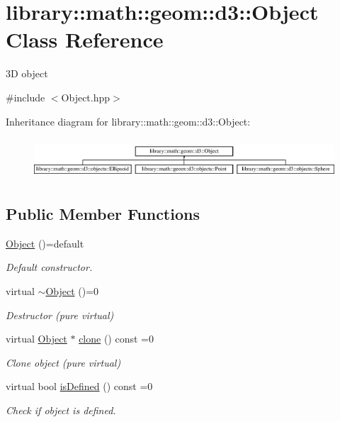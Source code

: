 \hypertarget{classlibrary_1_1math_1_1geom_1_1d3_1_1_object}{}\section{library\+:\+:math\+:\+:geom\+:\+:d3\+:\+:Object Class Reference}
\label{classlibrary_1_1math_1_1geom_1_1d3_1_1_object}


3D object  




{\ttfamily \#include $<$Object.\+hpp$>$}

Inheritance diagram for library\+:\+:math\+:\+:geom\+:\+:d3\+:\+:Object\+:\begin{figure}[H]
\begin{center}
\leavevmode
\includegraphics[height=1.530055cm]{classlibrary_1_1math_1_1geom_1_1d3_1_1_object}
\end{center}
\end{figure}
\subsection*{Public Member Functions}
\begin{DoxyCompactItemize}
\item 
\hyperlink{classlibrary_1_1math_1_1geom_1_1d3_1_1_object_ab484354bbce44290b6d288c7825d9e42}{Object} ()=default
\begin{DoxyCompactList}\small\item\em Default constructor. \end{DoxyCompactList}\item 
virtual \hyperlink{classlibrary_1_1math_1_1geom_1_1d3_1_1_object_addfda217130395f6eeb080a2fe406876}{$\sim$\+Object} ()=0
\begin{DoxyCompactList}\small\item\em Destructor (pure virtual) \end{DoxyCompactList}\item 
virtual \hyperlink{classlibrary_1_1math_1_1geom_1_1d3_1_1_object}{Object} $\ast$ \hyperlink{classlibrary_1_1math_1_1geom_1_1d3_1_1_object_a1a784c6b359e0eb97cd34fabc42f2f3f}{clone} () const =0
\begin{DoxyCompactList}\small\item\em Clone object (pure virtual) \end{DoxyCompactList}\item 
virtual bool \hyperlink{classlibrary_1_1math_1_1geom_1_1d3_1_1_object_a2216442e322f0c3ca5f01a4efa22baf7}{is\+Defined} () const =0
\begin{DoxyCompactList}\small\item\em Check if object is defined. \end{DoxyCompactList}\end{DoxyCompactItemize}


